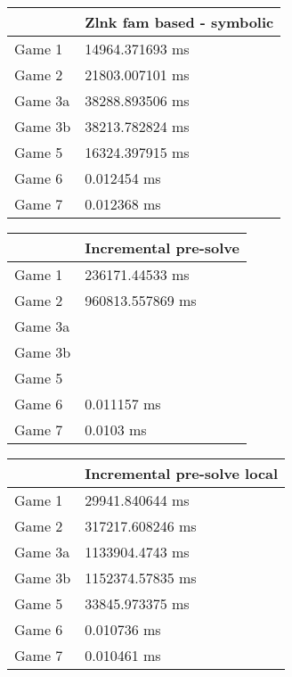 \begin{tabular}{|l|l|}
	\hline
	& Zlnk fam based - symbolic \\ \hline
	Game 1 & 14964.371693 ms \\ \hline
	Game 2 & 21803.007101 ms \\ \hline
	Game 3a & 38288.893506 ms \\ \hline
	Game 3b & 38213.782824 ms \\ \hline
	Game 5 & 16324.397915 ms \\ \hline
	Game 6 & 0.012454 ms \\ \hline
	Game 7 & 0.012368 ms \\ \hline
\end{tabular}
\begin{tabular}{|l|l|}
	\hline
	& Incremental pre-solve \\ \hline
	Game 1 & 236171.44533 ms \\ \hline
	Game 2 & 960813.557869 ms \\ \hline
	Game 3a & \dag \\ \hline
	Game 3b & \dag \\ \hline
	Game 5 & \dag \\ \hline
	Game 6 & 0.011157 ms \\ \hline
	Game 7 & 0.0103 ms \\ \hline
\end{tabular}
\begin{tabular}{|l|l|}
	\hline
	& Incremental pre-solve local \\ \hline
	Game 1 & 29941.840644 ms \\ \hline
	Game 2 & 317217.608246 ms \\ \hline
	Game 3a & 1133904.4743 ms \\ \hline
	Game 3b & 1152374.57835 ms \\ \hline
	Game 5 & 33845.973375 ms \\ \hline
	Game 6 & 0.010736 ms \\ \hline
	Game 7 & 0.010461 ms \\ \hline
\end{tabular}
